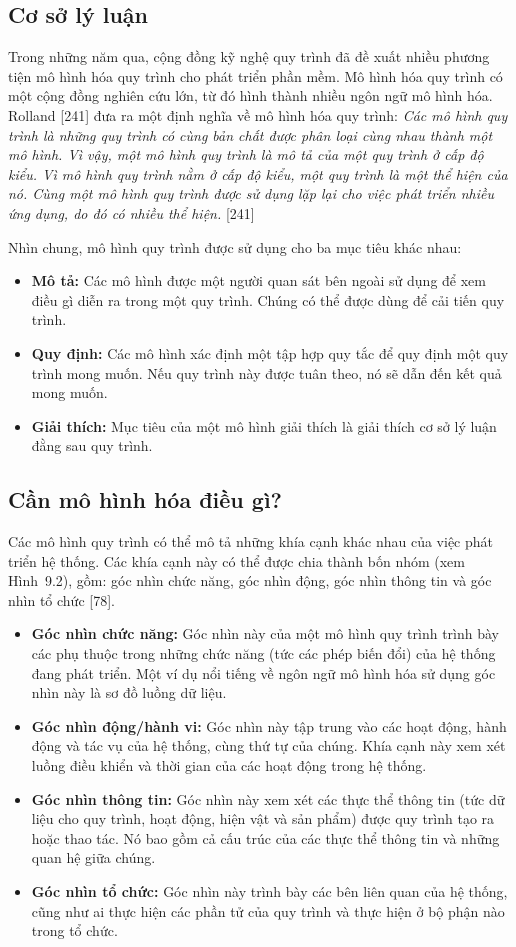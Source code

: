 \subsection{Cơ sở lý luận}
Trong những năm qua, cộng đồng kỹ nghệ quy trình đã đề xuất nhiều phương tiện mô hình hóa quy trình cho phát triển phần mềm. Mô hình hóa quy trình có một cộng đồng nghiên cứu lớn, từ đó hình thành nhiều ngôn ngữ mô hình hóa. Rolland [241] đưa ra một định nghĩa về mô hình hóa quy trình: \emph{Các mô hình quy trình là những quy trình có cùng bản chất được phân loại cùng nhau thành một mô hình. Vì vậy, một mô hình quy trình là mô tả của một quy trình ở cấp độ kiểu. Vì mô hình quy trình nằm ở cấp độ kiểu, một quy trình là một thể hiện của nó. Cùng một mô hình quy trình được sử dụng lặp lại cho việc phát triển nhiều ứng dụng, do đó có nhiều thể hiện.} [241]

Nhìn chung, mô hình quy trình được sử dụng cho ba mục tiêu khác nhau:
\begin{itemize}
\item \textbf{Mô tả:} Các mô hình được một người quan sát bên ngoài sử dụng để xem điều gì diễn ra trong một quy trình. Chúng có thể được dùng để cải tiến quy trình.
\item \textbf{Quy định:} Các mô hình xác định một tập hợp quy tắc để quy định một quy trình mong muốn. Nếu quy trình này được tuân theo, nó sẽ dẫn đến kết quả mong muốn.
\item \textbf{Giải thích:} Mục tiêu của một mô hình giải thích là giải thích cơ sở lý luận đằng sau quy trình.
\end{itemize}

\subsection{Cần mô hình hóa điều gì?}
Các mô hình quy trình có thể mô tả những khía cạnh khác nhau của việc phát triển hệ thống. Các khía cạnh này có thể được chia thành bốn nhóm (xem Hình~9.2), gồm: góc nhìn chức năng, góc nhìn động, góc nhìn thông tin và góc nhìn tổ chức [78].
\begin{itemize}
\item \textbf{Góc nhìn chức năng:} Góc nhìn này của một mô hình quy trình trình bày các phụ thuộc trong những chức năng (tức các phép biến đổi) của hệ thống đang phát triển. Một ví dụ nổi tiếng về ngôn ngữ mô hình hóa sử dụng góc nhìn này là sơ đồ luồng dữ liệu.
\item \textbf{Góc nhìn động/hành vi:} Góc nhìn này tập trung vào các hoạt động, hành động và tác vụ của hệ thống, cùng thứ tự của chúng. Khía cạnh này xem xét luồng điều khiển và thời gian của các hoạt động trong hệ thống.
\item \textbf{Góc nhìn thông tin:} Góc nhìn này xem xét các thực thể thông tin (tức dữ liệu cho quy trình, hoạt động, hiện vật và sản phẩm) được quy trình tạo ra hoặc thao tác. Nó bao gồm cả cấu trúc của các thực thể thông tin và những quan hệ giữa chúng.
\item \textbf{Góc nhìn tổ chức:} Góc nhìn này trình bày các bên liên quan của hệ thống, cũng như ai thực hiện các phần tử của quy trình và thực hiện ở bộ phận nào trong tổ chức.
\end{itemize}

